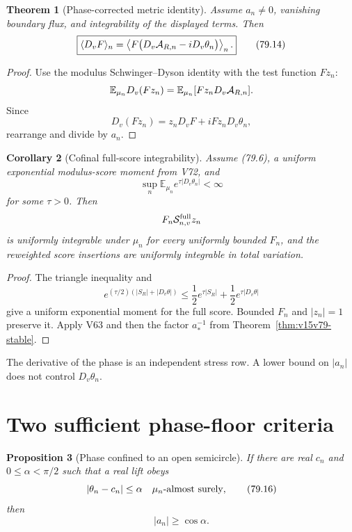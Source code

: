 \documentclass[11pt]{article}
\newtheorem{theorem}{Theorem}[section]
\newtheorem{proposition}[theorem]{Proposition}
\newtheorem{corollary}[theorem]{Corollary}
\theoremstyle{remark}
\begin{document}
\begin{theorem}[Phase-corrected metric identity]
\label{thm:v15v79-sd}
Assume \(a_n\ne0\), vanishing boundary flux, and integrability of
the displayed terms.  Then
\[
 \boxed{
 \langle D_vF\rangle_n
 =
 \left\langle
 F\bigl(D_v{\cal A}_{R,n}-iD_v\theta_n\bigr)
 \right\rangle_n.}                                    \tag{79.14}
\]
\end{theorem}

\begin{proof}
Use the modulus Schwinger--Dyson identity with the test function
\(Fz_n\):
\[
 \mathbb E_{\mu_n}D_v(Fz_n)
 =
 \mathbb E_{\mu_n}
 [Fz_nD_v{\cal A}_{R,n}].
\]
Since
\[
 D_v(Fz_n)=z_nD_vF+iFz_nD_v\theta_n,
\]
rearrange and divide by \(a_n\).
\end{proof}

\begin{corollary}[Cofinal full-score integrability]
\label{cor:v15v79-full-ui}
Assume (79.6), a uniform exponential modulus-score moment from
V72, and
\[
 \sup_n\mathbb E_{\mu_n}e^{\tau|D_v\theta_n|}<\infty   \tag{79.15}
\]
for some \(\tau>0\).  Then
\[
 F_n{\cal S}^{\rm full}_{n,v}z_n
\]
is uniformly integrable under \(\mu_n\) for every uniformly bounded
\(F_n\), and the reweighted score insertions are uniformly
integrable in total variation.
\end{corollary}

\begin{proof}
The triangle inequality and
\[
 e^{(\tau/2)(|S_R|+|D_v\theta|)}
 \leq
 \frac12e^{\tau|S_R|}+\frac12e^{\tau|D_v\theta|}
\]
give a uniform exponential moment for the full score.  Bounded
\(F_n\) and \(|z_n|=1\) preserve it.  Apply V63 and then the
factor \(a_*^{-1}\) from Theorem~\ref{thm:v15v79-stable}.
\end{proof}

The derivative of the phase is an independent stress row.  A lower
bound on \(|a_n|\) does not control \(D_v\theta_n\).

\section{Two sufficient phase-floor criteria}

\begin{proposition}[Phase confined to an open semicircle]
\label{prop:v15v79-semicircle}
If there are real \(c_n\) and \(0\leq\alpha<\pi/2\) such that a
real lift obeys
\[
 |\theta_n-c_n|\leq\alpha\quad\mu_n\hbox{-almost surely},        \tag{79.16}
\]
then
\[
 |a_n|\geq\cos\alpha.                                 \tag{79.17}
\]
\end{proposition}
\end{document}
